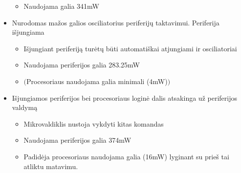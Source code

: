 \documentclass[a4paper, 12pt]{article} %
\begin{document}
\begin{onehalfspacing}
\begin{itemize}
\begin{itemize}
\item Naudojama galia 341mW
\end{itemize}
\item Nurodomas ma\v{z}os galios osciliatorius periferij\k{u} taktavimui. Periferija i\v{s}jungiama
\begin{itemize}
\item I\v{s}jungiant periferij\k{a} tur\.{e}t\k{u} b\={u}ti automati\v{s}kai atjungiami ir osciliatoriai
\item Naudojama periferijos galia 283.25mW
\item $($Procesoriaus naudojama galia minimali (4mW)$)$
\end{itemize} 
\item I\v{s}jungiamos periferijos bei procesoriaus login\.{e} dalis atsakinga u\v{z} periferijos valdym\k{a}
\begin{itemize}
\item Mikrovaldiklis nustoja vykdyti kitas komandas
\item Naudojama periferijos galia 374mW
\item Padid\.{e}ja procesoriaus naudojama galia (16mW) lyginant su prie\v{s} tai atliktu matavimu.
\end{itemize}
\end{itemize}


\end{onehalfspacing}
\end{document}
